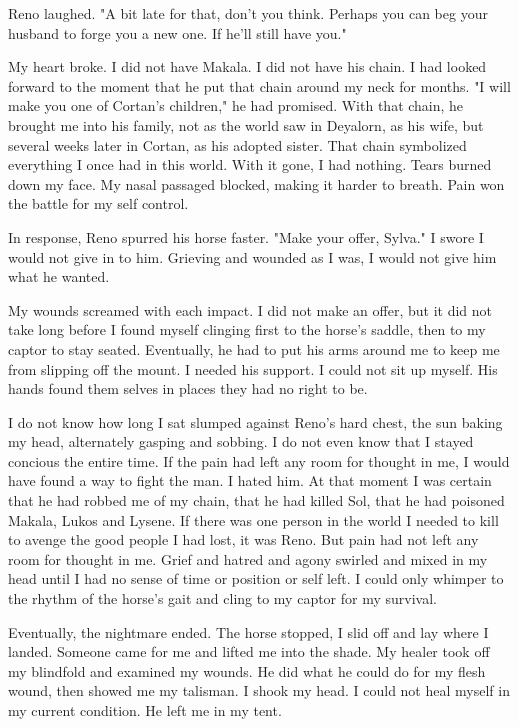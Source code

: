 \documentclass{article}
\begin{document}
Reno laughed. "A bit late for that, don't you think. Perhaps you can beg your husband to forge you a new one. If he'll still have you." 

My heart broke. I did not have Makala. I did not have his chain. I had looked forward to the moment that he put that chain around my neck for months. "I will make you one of Cortan's children," he had promised. With that chain, he brought me into his family, not as the world saw in Deyalorn, as his wife, but several weeks later in Cortan, as his adopted sister. That chain symbolized everything I once had in this world. With it gone, I had nothing. Tears burned down my face. My nasal passaged blocked, making it harder to breath. Pain won the battle for my self control. 

In response, Reno spurred his horse faster. "Make your offer, Sylva." I swore I would not give in to him. Grieving and wounded as I was, I would not give him what he wanted. 

My wounds screamed with each impact. I did not make an offer, but it did not take long before I found myself clinging first to the horse's saddle, then to my captor to stay seated. Eventually, he had to put his arms around me to keep me from slipping off the mount. I needed his support. I could not sit up myself. His hands found them selves in places they had no right to be. 

I do not know how long I sat slumped against Reno's hard chest, the sun baking my head, alternately gasping and sobbing. I do not even know that I stayed concious the entire time. If the pain had left any room for thought in me, I would have found a way to fight the man. I hated him. At that moment I was certain that he had robbed me of my chain, that he had killed Sol, that he had poisoned Makala, Lukos and Lysene. If there was one person in the world I needed to kill to avenge the good people I had lost, it was Reno. But pain had not left any room for thought in me. Grief and hatred and agony swirled and mixed in my head until I had no sense of time or position or self left. I could only whimper to the rhythm of the horse's gait and cling to my captor for my survival.

Eventually, the nightmare ended. The horse stopped, I slid off and lay where I landed. Someone came for me and lifted me into the shade. My healer took off my blindfold and examined my wounds. He did what he could do for my flesh wound, then showed me my talisman. I shook my head. I could not heal myself in my current condition. He left me in my tent.
\end{document}
